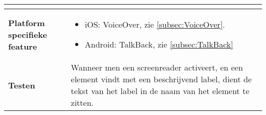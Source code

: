 \begin{table}[H]
\begin{tabular}{|l|p{12cm}|}
\begin{itemize}
            
        \end{itemize}                                                                                                                                                                                                                                                                                                                                                                                                                                                               \\ 

         \hline
        \textbf{Platform specifieke feature} & \begin{itemize}
            \item iOS: VoiceOver, zie \ref{subsec:VoiceOver}.
            \item Android: TalkBack, zie \ref{subsec:TalkBack}
        \end{itemize}                                                                                                                                                                       \\ 
          \hline
        \textbf{Testen}                       & Wanneer men een screenreader activeert, en een element vindt met een beschrijvend label,  dient de tekst van het label in de naam van het element te zitten.                           \\
        \hline
    \end{tabular}
    
\end{table}

